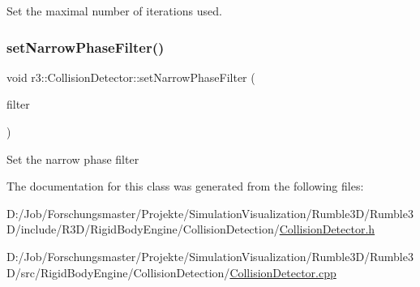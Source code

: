 Set the maximal number of iterations used. \mbox{\label{classr3_1_1_collision_detector_a98f6ab749622d7fcffbdc0dcf59cfa75}} 
\subsubsection{\texorpdfstring{set\+Narrow\+Phase\+Filter()}{setNarrowPhaseFilter()}}
{\footnotesize\ttfamily void r3\+::\+Collision\+Detector\+::set\+Narrow\+Phase\+Filter (\begin{DoxyParamCaption}\item[{\mbox{\hyperlink{classr3_1_1_collision_detector_a094cc287cba14d5a063cfca41e667008}{Narrow\+Phase\+Filter\+\_\+\+Ptr}}}]{filter }\end{DoxyParamCaption})}

Set the narrow phase filter 

The documentation for this class was generated from the following files\+:\begin{DoxyCompactItemize}
\item 
D\+:/\+Job/\+Forschungsmaster/\+Projekte/\+Simulation\+Visualization/\+Rumble3\+D/\+Rumble3\+D/include/\+R3\+D/\+Rigid\+Body\+Engine/\+Collision\+Detection/\mbox{\hyperlink{_collision_detector_8h}{Collision\+Detector.\+h}}\item 
D\+:/\+Job/\+Forschungsmaster/\+Projekte/\+Simulation\+Visualization/\+Rumble3\+D/\+Rumble3\+D/src/\+Rigid\+Body\+Engine/\+Collision\+Detection/\mbox{\hyperlink{_collision_detector_8cpp}{Collision\+Detector.\+cpp}}\end{DoxyCompactItemize}
